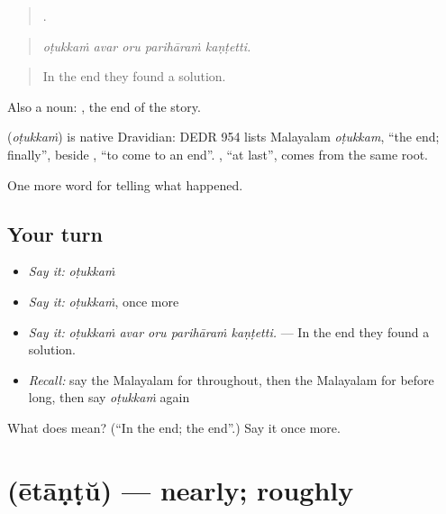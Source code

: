 \begin{quote}
    .
\end{quote}

\begin{quote}
\emph{oṭukkaṁ avar oru parihāraṁ kaṇṭetti.}
\end{quote}

\begin{quote}
In the end they found a solution.
\end{quote}

Also a noun:  , the end of the story.

\begin{cousinweb}
\textbf{} (\emph{oṭukkaṁ}) is native Dravidian: DEDR 954 lists Malayalam \emph{oṭukkam}, \textquotedblleft{}the end; finally\textquotedblright{}, beside , \textquotedblleft{}to come to an end\textquotedblright{}. , \textquotedblleft{}at last\textquotedblright{}, comes from the same root.
\end{cousinweb}

\begin{grammarlens}[title={What you've built}]
One more word for telling what happened.
\end{grammarlens}

\subsection*{Your turn}
\begin{itemize}
\raggedright
  \item \emph{Say it:} \emph{oṭukkaṁ}
  \item \emph{Say it:} \emph{oṭukkaṁ}, once more
  \item \emph{Say it:} \emph{oṭukkaṁ avar oru parihāraṁ kaṇṭetti.} — In the end they found a solution.
  \item \emph{Recall:} say the Malayalam for throughout, then the Malayalam for before long, then say \emph{oṭukkaṁ} again
\end{itemize}

\begin{tcolorbox}[breakable,colback=teal!4,colframe=teal!35!black,title={Before you move on}]
What does  mean? (\textquotedblleft{}In the end; the end\textquotedblright{}.) Say it once more.
\end{tcolorbox}
\section[\texorpdfstring{\ml{ഏതാണ്ട്} (ētāṇṭŭ)}{ഏതാണ്ട് (ētāṇṭŭ)}]{ (ētāṇṭŭ) — nearly; roughly}

